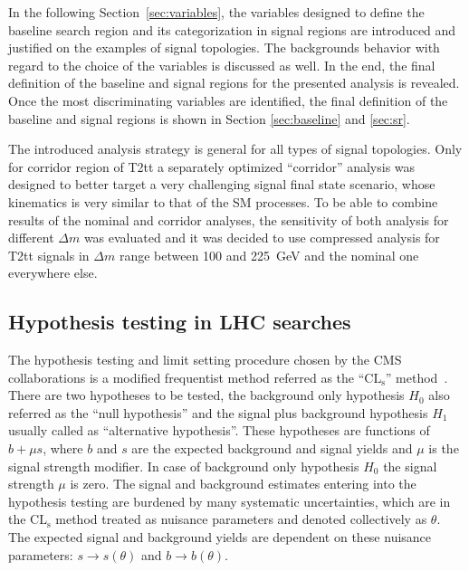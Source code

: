 In the following Section~\ref{sec:variables}, the variables designed to define the baseline search region and its categorization in signal regions are introduced and justified on the examples of signal topologies. The backgrounds behavior with regard to the choice of the variables is discussed as well. In the end, the final definition of the baseline and signal regions for the presented analysis is revealed. Once the most discriminating variables are identified, the final definition of the baseline and signal regions is shown in Section \ref{sec:baseline} and \ref{sec:sr}. 

The introduced analysis strategy is general for all types of signal topologies. Only for corridor region of T2tt a separately optimized ``corridor'' analysis was designed to better target a very challenging signal final state scenario, whose kinematics is very similar to that of the SM processes. To be able to combine results of the nominal and corridor analyses, the sensitivity of both analysis for different $\Delta m$ was evaluated and it was decided to use compressed analysis for T2tt signals in $\Delta m$ range between 100 and 225~GeV and the nominal one everywhere else.



\subsection{Hypothesis testing in LHC searches~\label{sec:stats} }

The hypothesis testing and limit setting procedure chosen by the CMS collaborations is a modified frequentist method referred as the ``$\mathrm{CL_{s}}$'' method~\cite{Read:2002hq, CMS-NOTE-2011-005}. There are two hypotheses to be tested, the background only hypothesis $H_{0}$ also referred as the ``null hypothesis'' and the signal plus background hypothesis $H_{1}$ usually called as ``alternative hypothesis''. These hypotheses are functions of $b+\mu s$, where $b$ and $s$ are the expected background and signal yields and $\mu$ is the signal strength modifier. In case of background only hypothesis $H_{0}$ the signal strength $\mu$ is zero. The signal and background estimates entering into the hypothesis testing are burdened by many systematic uncertainties, which are in the $\mathrm{CL_{s}}$ method treated as nuisance parameters and denoted collectively as $\theta$. The expected signal and background yields are dependent on these nuisance parameters: $s \to s(\theta)$ and $b \to b(\theta)$.

